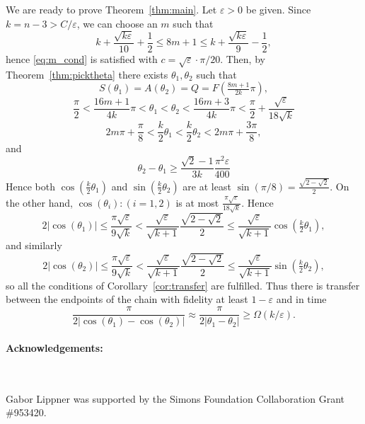 \documentclass{article}
\theoremstyle{definition}
\numberwithin{equation}{section}
\numberwithin{theorem}{section}
\newcommand{\ep}{\varepsilon}
\begin{document}
We are ready to prove Theorem~\ref{thm:main}. Let $\ep > 0$ be given. Since $k = n-3 > C/\ep$, we can choose an $m$ such that  
\[ k + \frac{\sqrt{k \ep}}{10}+\frac{1}{2} \leq 8m+1 \leq k + \frac{\sqrt{k \ep}}{9}- \frac{1}{2},\] hence \eqref{eq:m_cond} is satisfied with $c= \sqrt{\ep}\cdot \pi/20$. Then, by Theorem~\ref{thm:picktheta} there exists $\theta_1, \theta_2$ such that 
\[ S(\theta_1) = A
(\theta_2) = Q = F\left(\tfrac{8m+1}{2k}\pi\right),\]
\[ \frac{\pi}{2} < \frac{16m+1}{4k}\pi < \theta_1 < \theta_2 < \frac{16m+3}{4k}\pi < \frac{\pi}{2}+\frac{\sqrt{\ep}}{18 \sqrt{k}}\]
 \[ 2m\pi + \frac{\pi}{8} < \frac{k}{2}\theta_1 < \frac{k}{2}\theta_2 < 2m\pi + \frac{3\pi}{8},\] and 
 \[ \theta_2 - \theta_1 \geq \frac{\sqrt{2}-1}{3k} \frac{\pi^2\ep}{400}\]
Hence both $\cos(\tfrac{k}{2}\theta_1)$ and $\sin(\tfrac{k}{2}\theta_2)$ are at least $\sin(\pi/8) = \tfrac{\sqrt{2-\sqrt{2}}}{2}$.
On the other hand, $\cos(\theta_i): (i=1,2)$ is at most $\tfrac{\pi \sqrt{\ep}}{18\sqrt{k}}$. Hence
\[ 2|\cos(\theta_1)| \leq \frac{\pi\sqrt{\ep}}{9 \sqrt{k}} < \frac{\sqrt{\ep}}{\sqrt{k+1}}\frac{\sqrt{2-\sqrt{2}}}{2} \leq \frac{\sqrt{\ep}}{\sqrt{k+1}}\cos\left(\tfrac{k}{2}\theta_1\right),\] and similarly 
\[ 2|\cos(\theta_2)| \leq \frac{\pi\sqrt{\ep}}{9 \sqrt{k}} < \frac{\sqrt{\ep}}{\sqrt{k+1}}\frac{\sqrt{2-\sqrt{2}}}{2} \leq \frac{\sqrt{\ep}}{\sqrt{k+1}}\sin\left(\tfrac{k}{2}\theta_2\right),\] so all the conditions of Corollary~\ref{cor:transfer} are fulfilled. Thus there is transfer between the endpoints of the chain with fidelity at least $1-\ep$ and in time 
\[ \frac{\pi}{2|\cos(\theta_1)-\cos(\theta_2)|} \approx \frac{\pi}{2|\theta_1 - \theta_2|} \geq \Omega(k/\ep).\]

\paragraph{Acknowledgements:} ~

Gabor Lippner was supported by the Simons Foundation Collaboration Grant \#953420.



\end{document}
